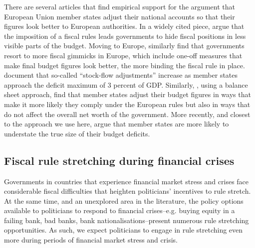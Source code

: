\documentclass[]{article}
\begin{document}
There are several articles that find empirical support for the argument that European Union member states adjust their national accounts so that their figures look better to European authorities.  In a widely cited piece, \cite{Milesi-Ferretti2003} argue that the imposition of a fiscal rules leads governments to hide fiscal positions in less visible parts of the budget. Moving to Europe, \cite{KoenNoord2005} similarly find that governments resort to more fiscal gimmicks in Europe, which include one-off measures that make final budget figures look better, the more binding the fiscal rule in place. \cite{vonHagenWolff2006} document that so-called ``stock-flow adjustments'' increase as member states approach the  deficit maximum of 3 percent of GDP.  Similarly, \cite{MilesiMoriyama2006}, using a balance sheet approach, find that member states adjust their budget figures in ways that make it more likely they comply under the European rules but also in ways that do not affect the overall net worth of the government.  More recently, and closest to the approach we use here, \cite{DeCastro2013} argue that member states are more likely to understate the true size of their budget deficits.

\subsection{Fiscal rule stretching during financial crises}

Governments in countries that experience financial market stress and crises face considerable fiscal difficulties \cite[see][]{Laeven2012} that heighten politicians' incentives to rule stretch. At the same time, and an unexplored area in the literature, the policy options available to politicians to respond to financial crises--e.g. buying equity in a failing bank, bad banks, bank nationalisations--present numerous rule stretching opportunities. As such, we expect politicians to engage in rule stretching even more during periods of financial market stress and crisis.
\end{document}
